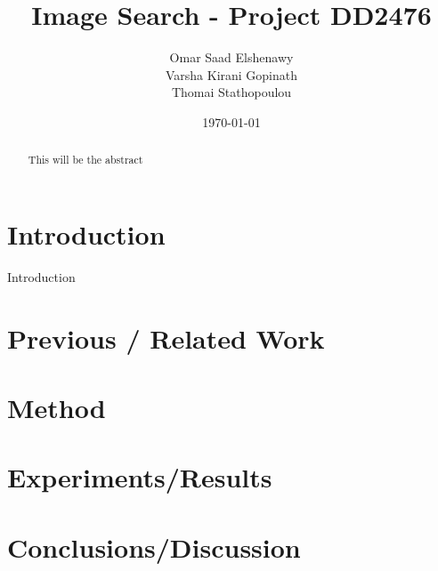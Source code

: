 \documentclass[a4paper,12pt,titlepage]{article}
\title{Image Search - Project DD2476}
\author{Omar Saad Elshenawy\\Varsha Kirani Gopinath\\Thomai Stathopoulou}
\date{\today}
\begin{document}
\maketitle
\thispagestyle{fancy}


\begin{abstract}
This will be the abstract
\end{abstract}

\clearpage

\section{Introduction}
Introduction

\section{Previous / Related Work}

\section{Method}

\section{Experiments/Results}

\section{Conclusions/Discussion}





\end{document}
